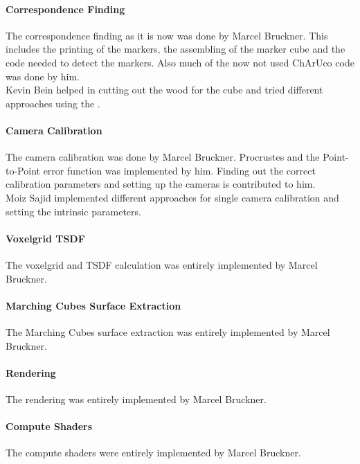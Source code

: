 \documentclass[10pt,twocolumn,letterpaper]{article}
\begin{document}
\paragraph{Correspondence Finding}
The correspondence finding as it is now was done by Marcel Bruckner. This includes the printing of the markers, the assembling of the marker cube and the code needed to detect the markers. Also much of the now not used ChArUco code was done by him.\\
Kevin Bein helped in cutting out the wood for the cube and tried different approaches using the \charuco{}.
\paragraph{Camera Calibration}
The camera calibration was done by Marcel Bruckner. Procrustes and the Point-to-Point error function was implemented by him. Finding out the correct calibration parameters and setting up the cameras is contributed to him.\\
Moiz Sajid implemented different approaches for single camera calibration and setting the intrinsic parameters.

\paragraph{Voxelgrid TSDF}
The voxelgrid and TSDF calculation was entirely implemented by Marcel Bruckner.

\paragraph{Marching Cubes Surface Extraction}
The Marching Cubes surface extraction was entirely implemented by Marcel Bruckner.

\paragraph{Rendering}
The rendering was entirely implemented by Marcel Bruckner.

\paragraph{Compute Shaders}
The compute shaders were entirely implemented by Marcel Bruckner.


\newpage
\end{document}

